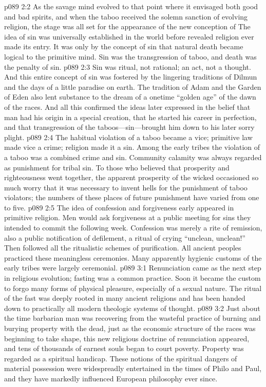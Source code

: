 \vs p089 2:2 As the savage mind evolved to that point where it envisaged both good and bad spirits, and when the taboo received the solemn sanction of evolving religion, the stage was all set for the appearance of the new conception of  The idea of sin was universally established in the world before revealed religion ever made its entry. It was only by the concept of sin that natural death became logical to the primitive mind. Sin was the transgression of taboo, and death was the penalty of sin.
\vs p089 2:3 Sin was ritual, not rational; an act, not a thought. And this entire concept of sin was fostered by the lingering traditions of Dilmun and the days of a little paradise on earth. The tradition of Adam and the Garden of Eden also lent substance to the dream of a onetime “golden age” of the dawn of the races. And all this confirmed the ideas later expressed in the belief that man had his origin in a special creation, that he started his career in perfection, and that transgression of the taboos---sin---brought him down to his later sorry plight.
\vs p089 2:4 The habitual violation of a taboo became a vice; primitive law made vice a crime; religion made it a sin. Among the early tribes the violation of a taboo was a combined crime and sin. Community calamity was always regarded as punishment for tribal sin. To those who believed that prosperity and righteousness went together, the apparent prosperity of the wicked occasioned so much worry that it was necessary to invent hells for the punishment of taboo violators; the numbers of these places of future punishment have varied from one to five.
\vs p089 2:5 The idea of confession and forgiveness early appeared in primitive religion. Men would ask forgiveness at a public meeting for sins they intended to commit the following week. Confession was merely a rite of remission, also a public notification of defilement, a ritual of crying “unclean, unclean!” Then followed all the ritualistic schemes of purification. All ancient peoples practiced these meaningless ceremonies. Many apparently hygienic customs of the early tribes were largely ceremonial.\plusone
{}
\vs p089 3:1 Renunciation came as the next step in religious evolution; fasting was a common practice. Soon it became the custom to forgo many forms of physical pleasure, especially of a sexual nature. The ritual of the fast was deeply rooted in many ancient religions and has been handed down to practically all modern theologic systems of thought.
\vs p089 3:2 Just about the time barbarian man was recovering from the wasteful practice of burning and burying property with the dead, just as the economic structure of the races was beginning to take shape, this new religious doctrine of renunciation appeared, and tens of thousands of earnest souls began to court poverty. Property was regarded as a spiritual handicap. These notions of the spiritual dangers of material possession were widespreadly entertained in the times of Philo and Paul, and they have markedly influenced European philosophy ever since.
